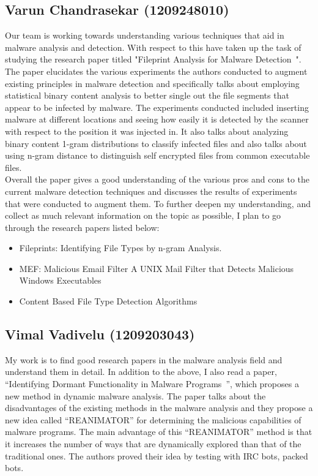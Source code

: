 \documentclass[16pt]{article}
\begin{document}
		\subsection{Varun Chandrasekar (1209248010)}
		Our team is working towards understanding various techniques that aid in malware analysis and detection. With respect to this have taken up the task of studying the research paper titled "Fileprint Analysis for Malware Detection~\cite{stolfo2005fileprint}". The paper elucidates the various experiments the authors conducted to augment existing principles in malware detection and specifically talks about employing statistical binary content analysis to better single out the file segments that appear to be infected by malware. The experiments conducted included inserting malware at different locations and seeing how easily it is detected by the scanner with respect to the position it was injected in. It also talks about analyzing binary content 1-gram distributions to classify infected files and also talks about using n-gram distance to distinguish self encrypted files from common executable files.\\
		
		Overall the paper gives a good understanding of the various pros and cons to the current malware detection techniques and discusses the results of experiments that were conducted to augment them. To further deepen my understanding, and collect as much relevant information on the topic as possible, I plan to go through the research papers listed below:
		\begin{itemize}
			\item Fileprints: Identifying File Types by n-gram Analysis.~\cite{li2005fileprints}
			\item MEF: Malicious Email Filter A UNIX Mail Filter that Detects Malicious Windows Executables~\cite{schultz2001mef}
			\item Content Based File Type Detection Algorithms~\cite{mcdaniel2003content}
		\end{itemize}
		\subsection{Vimal Vadivelu (1209203043)}
		My work is to find good research papers in the malware analysis field and understand them in detail. In addition to the above, I also read a paper, “Identifying Dormant Functionality in Malware Programs~\cite{comparetti2010identifying}”, which proposes a new method in dynamic malware analysis. The paper talks about the disadvantages of the existing methods in the malware analysis and they propose a new idea called “REANIMATOR” for determining the malicious capabilities of malware programs. The main advantage of this “REANIMATOR” method is that it increases the number of ways that are dynamically explored than that of the traditional ones. The authors proved their idea by testing with IRC bots, packed bots. \\
		
\end{document}
